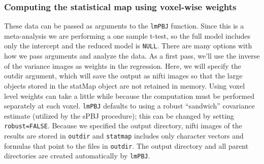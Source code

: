 \documentclass[]{article}
\newenvironment{Shaded}{\begin{snugshade}}{\end{snugshade}}
\newcommand{\CommentTok}[1]{\textcolor[rgb]{0.56,0.35,0.01}{\textit{#1}}}
\newcommand{\DecValTok}[1]{\textcolor[rgb]{0.00,0.00,0.81}{#1}}
\newcommand{\KeywordTok}[1]{\textcolor[rgb]{0.13,0.29,0.53}{\textbf{#1}}}
\newcommand{\NormalTok}[1]{#1}
\newcommand{\OperatorTok}[1]{\textcolor[rgb]{0.81,0.36,0.00}{\textbf{#1}}}
\newcommand{\StringTok}[1]{\textcolor[rgb]{0.31,0.60,0.02}{#1}}
\begin{document}
\begin{Shaded}
\end{Shaded}

\hypertarget{computing-the-statistical-map-using-voxel-wise-weights}{%
\subsubsection{Computing the statistical map using voxel-wise
weights}\label{computing-the-statistical-map-using-voxel-wise-weights}}

These data can be passed as arguments to the \texttt{lmPBJ} function.
Since this is a meta-analysis we are performing a one sample t-test, so
the full model includes only the intercept and the reduced model is
\texttt{NULL}. There are many options with how we pass arguments and
analyze the data. As a first pass, we'll use the inverse of the variance
images as weights in the regression. Here, we will specify the outdir
argument, which will save the output as nifti images so that the large
objects stored in the statMap object are not retained in memory. Using
voxel level weights can take a little while because the computation must
be performed separately at each voxel. \texttt{lmPBJ} defaults to using
a robust ``sandwich'' covariance estimate (utilized by the sPBJ
procedure); this can be changed by setting \texttt{robust=FALSE}.
Because we specified the output directory, nifti images of the results
are stored in \texttt{outdir} and \texttt{statmap} includes only
character vectors and formulas that point to the files in
\texttt{outdir}. The output directory and all parent directories are
created automatically by \texttt{lmPBJ}.
\end{document}

